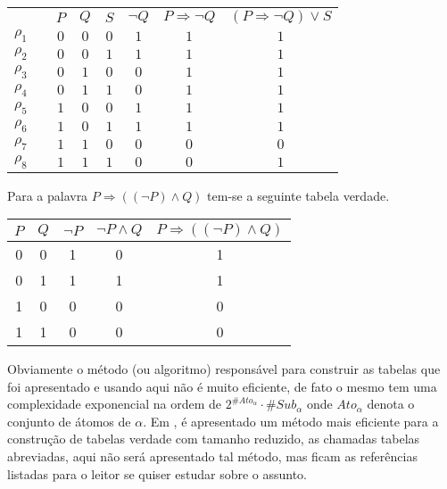 \begin{exemplo}
  \begin{table}[H]
    \centering
    \begin{tabular}{|lc|c|c|c|c|c|c|}
      \hline
      & & $P$ & $Q$ & $S$ & $\neg Q$ & $P \Rightarrow \neg Q$ & $(P \Rightarrow \neg Q) \lor S$\\
      $\rho_1$ & & $0$ & $0$ & $0$ & $1$ & $1$ & $1$ \\
      $\rho_2$ & & $0$ & $0$ & $1$ & $1$ & $1$ & $1$ \\
      $\rho_3$ & & $0$ & $1$ & $0$ & $0$ & $1$ & $1$ \\
      $\rho_4$ & & $0$ & $1$ & $1$ & $0$ & $1$ & $1$ \\
      $\rho_5$ & & $1$ & $0$ & $0$ & $1$ & $1$ & $1$ \\
      $\rho_6$ & & $1$ & $0$ & $1$ & $1$ & $1$ & $1$ \\
      $\rho_7$ & & $1$ & $1$ & $0$ & $0$ & $0$ & $0$ \\
      $\rho_8$ & & $1$ & $1$ & $1$ & $0$ & $0$ & $1$ \\
      \hline
    \end{tabular}
  \end{table}
\end{exemplo}

\begin{exemplo}
  Para a palavra $P \Rightarrow ((\neg P) \land Q)$ tem-se a seguinte tabela verdade.

  \begin{table}[H]
    \centering
    \begin{tabular}{|c|c|c|c|c|}
      \hline
      $P$ & $Q$ & $\neg P$ & $\neg P \land Q$ & $P \Rightarrow ((\neg P) \land Q)$ \\ \hline
      0 & 0 & 1 & 0 & 1 \\ \hline
      0 & 1 & 1 & 1 & 1 \\ \hline
      1 & 0 & 0 & 0 & 0 \\ \hline
      1 & 1 & 0 & 0 & 0 \\ \hline
    \end{tabular}
  \end{table}
\end{exemplo}

Obviamente o método (ou algoritmo) responsável para construir as tabelas que foi apresentado e usando aqui não é muito eficiente, de fato o mesmo tem uma complexidade exponencial na ordem de $2^{\#Ato_\alpha} \cdot \# Sub_\alpha$ onde $Ato_\alpha$ denota o conjunto de átomos de $\alpha$. Em \cite{benja-Logica, leonidas2002}, é apresentado um método mais eficiente para a construção de tabelas verdade com tamanho reduzido, as chamadas tabelas abreviadas, aqui não será apresentado tal método, mas ficam as referências listadas para o leitor se quiser estudar sobre o assunto.

